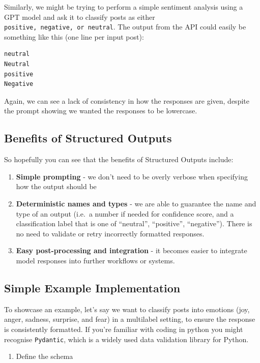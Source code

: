 \documentclass[
  letterpaper,
  DIV=11,
  numbers=noendperiod]{scrreprt}
\providecommand{\tightlist}{%
  \setlength{\itemsep}{0pt}\setlength{\parskip}{0pt}}\usepackage{longtable,booktabs,array}
\begin{document}
Similarly, we might be trying to perform a simple sentiment analysis
using a GPT model and ask it to classify posts as either
\texttt{positive,\ negative,\ or\ neutral}. The output from the API
could easily be something like this (one line per input post):

\begin{verbatim}
neutral
Neutral
positive
Negative
\end{verbatim}

Again, we can see a lack of consistency in how the responses are given,
despite the prompt showing we wanted the responses to be lowercase.

\subsection{Benefits of Structured
Outputs}\label{benefits-of-structured-outputs}

So hopefully you can see that the benefits of Structured Outputs
include:

\begin{enumerate}
\def\labelenumi{\arabic{enumi}.}
\item
  \textbf{Simple prompting} - we don't need to be overly verbose when
  specifying how the output should be
\item
  \textbf{Deterministic names and types} - we are able to guarantee the
  name and type of an output (i.e.~a number if needed for confidence
  score, and a classification label that is one of ``neutral'',
  ``positive'', ``negative''). There is no need to validate or retry
  incorrectly formatted responses.
\item
  \textbf{Easy post-processing and integration} - it becomes easier to
  integrate model responses into further workflows or systems.
\end{enumerate}

\subsection{Simple Example
Implementation}\label{simple-example-implementation}

To showcase an example, let's say we want to classify posts into
emotions (joy, anger, sadness, surprise, and fear) in a multilabel
setting, to ensure the response is consistently formatted. If you're
familiar with coding in python you might recognise \texttt{Pydantic},
which is a widely used data validation library for Python.

\begin{enumerate}
\def\labelenumi{\arabic{enumi}.}
\tightlist
\item
  Define the schema
\end{enumerate}
\end{document}
